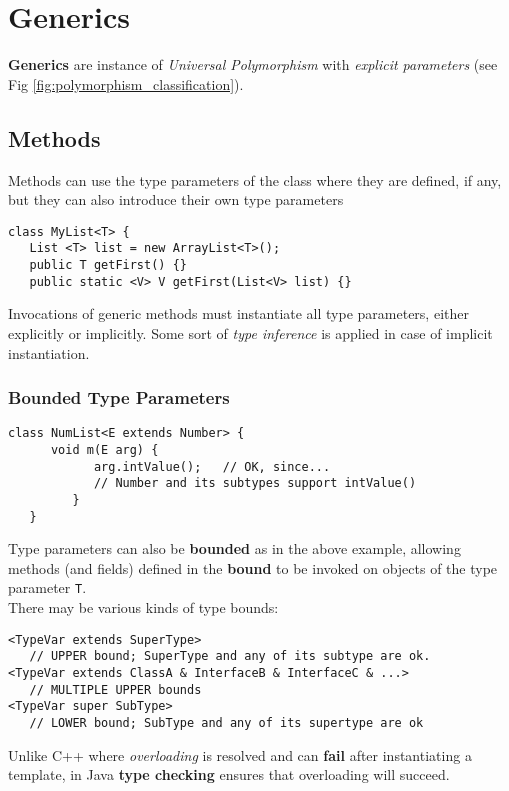 \chapter{Generics}
\textbf{Generics} are instance of \textit{Universal Polymorphism} with \textit{explicit parameters} (see Fig \ref{fig:polymorphism_classification}).

\section{Methods}
Methods can use the type parameters of the class
where they are defined, if any, but they can also introduce their own type parameters
\begin{lstlisting}
class MyList<T> {
   List <T> list = new ArrayList<T>();
   public T getFirst() {}
   public static <V> V getFirst(List<V> list) {}
\end{lstlisting}
Invocations of generic methods must instantiate all
type parameters, either explicitly or implicitly.
Some sort of \textit{type inference} is applied in case of implicit instantiation.

\subsection{Bounded Type Parameters}
\begin{lstlisting}
class NumList<E extends Number> {
      void m(E arg) {
            arg.intValue();   // OK, since...
            // Number and its subtypes support intValue()
         }
   }
\end{lstlisting}

Type parameters can also be \textbf{bounded} as in the above example,
allowing methods (and fields) defined in the \textbf{bound} to be invoked on objects of the type parameter \lstinline|T|.\\
There may be various kinds of type bounds:
\begin{lstlisting}
<TypeVar extends SuperType>
   // UPPER bound; SuperType and any of its subtype are ok.
<TypeVar extends ClassA & InterfaceB & InterfaceC & ...>
   // MULTIPLE UPPER bounds
<TypeVar super SubType>
   // LOWER bound; SubType and any of its supertype are ok
\end{lstlisting}

Unlike C++ where \textit{overloading} is resolved and can \textbf{fail} after
instantiating a template, in Java \textbf{type checking} ensures that
overloading will succeed.

\newpage
